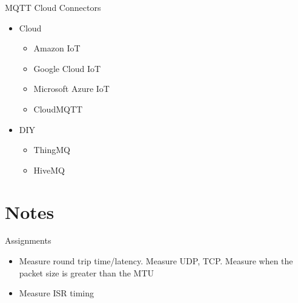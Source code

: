 \begin{frame}{MQTT Cloud Connectors}
\protect\hypertarget{mqtt-cloud-connectors}{}

\begin{itemize}
\tightlist
\item
  Cloud

  \begin{itemize}
  \tightlist
  \item
    Amazon IoT
  \item
    Google Cloud IoT
  \item
    Microsoft Azure IoT
  \item
    CloudMQTT
  \end{itemize}
\item
  DIY

  \begin{itemize}
  \tightlist
  \item
    ThingMQ
  \item
    HiveMQ
  \end{itemize}
\end{itemize}

\end{frame}

\hypertarget{notes}{%
\section{Notes}\label{notes}}

\begin{frame}{Assignments}
\protect\hypertarget{assignments}{}

\begin{itemize}
\item
  Measure round trip time/latency. Measure UDP, TCP. Measure when the
  packet size is greater than the MTU
\item
  Measure ISR timing
\end{itemize}

\end{frame}
